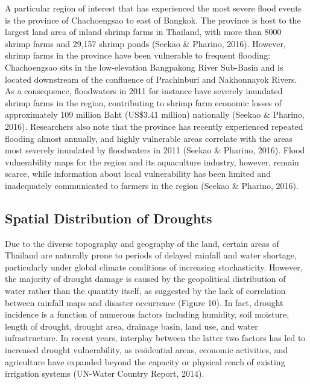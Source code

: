 A particular region of interest that has experienced the most severe flood events is the province of Chachoengsao to east of Bangkok. The province is host to the largest land area of inland shrimp farms in Thailand, with more than 8000 shrimp farms and 29,157 shrimp ponds (Seekao \& Pharino, 2016). However, shrimp farms in the province have been vulnerable to frequent flooding: Chachoengsao sits in the low-elevation Bangpakong River Sub-Basin and is located downstream of the confluence of Prachinburi and Nakhonnayok Rivers. As a consequence, floodwaters in 2011 for instance have severely inundated shrimp farms in the region, contributing to shrimp farm economic losses of approximately 109 million Baht (US\$3.41 million) nationally (Seekao \& Pharino, 2016). Researchers also note that the province has recently experienced repeated flooding almost annually, and highly vulnerable areas correlate with the areas most severely inundated by floodwaters in 2011 (Seekao \& Pharino, 2016). Flood vulnerability maps for the region and its aquaculture industry, however, remain scarce, while information about local vulnerability has been limited and inadequately communicated to farmers in the region (Seekao \& Pharino, 2016). 

\subsection{Spatial Distribution of Droughts}

Due to the diverse topography and geography of the land, certain areas of Thailand are naturally prone to periods of delayed rainfall and water shortage, particularly under global climate conditions of increasing stochasticity. However, the majority of drought damage is caused by the geopolitical distribution of water rather than the quantity itself, as suggested by the lack of correlation between rainfall maps and disaster occurrence (Figure 10). In fact, drought incidence is a function of numerous factors including humidity, soil moisture, length of drought, drought area, drainage basin, land use, and water infrastructure. In recent years, interplay between the latter two factors has led to increased drought vulnerability, as residential areas, economic activities, and agriculture have expanded beyond the capacity or physical reach of existing irrigation systems (UN-Water Country Report, 2014). 

